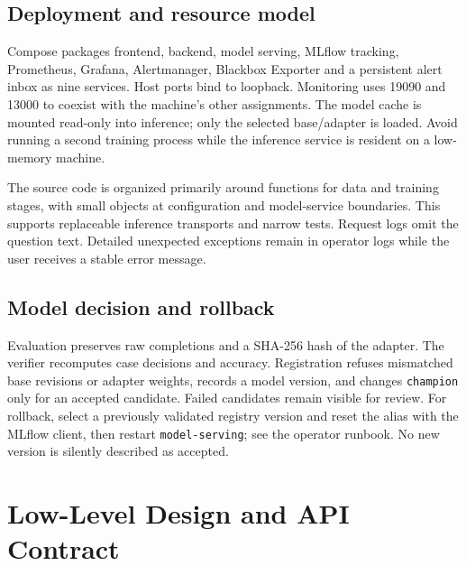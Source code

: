 \documentclass[11pt,a4paper]{article}
\begin{document}
\subsection*{Deployment and resource model}
Compose packages frontend, backend, model serving, MLflow tracking, Prometheus, Grafana, Alertmanager, Blackbox Exporter and a persistent alert inbox as nine services. Host ports bind to loopback. Monitoring uses 19090 and 13000 to coexist with the machine's other assignments. The model cache is mounted read-only into inference; only the selected base/adapter is loaded. Avoid running a second training process while the inference service is resident on a low-memory machine.

The source code is organized primarily around functions for data and training stages, with small objects at configuration and model-service boundaries. This supports replaceable inference transports and narrow tests. Request logs omit the question text. Detailed unexpected exceptions remain in operator logs while the user receives a stable error message.

\subsection*{Model decision and rollback}
Evaluation preserves raw completions and a SHA-256 hash of the adapter. The verifier recomputes case decisions and accuracy. Registration refuses mismatched base revisions or adapter weights, records a model version, and changes \texttt{champion} only for an accepted candidate. Failed candidates remain visible for review. For rollback, select a previously validated registry version and reset the alias with the MLflow client, then restart \texttt{model-\allowbreak{}serving}; see the operator runbook. No new version is silently described as accepted.

\clearpage
\section*{Low-Level Design and API Contract}
\end{document}
